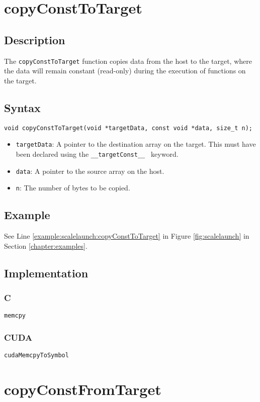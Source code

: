 \newpage
\section{copyConstToTarget}

\subsection{Description}

The \verb+copyConstToTarget+ function copies data from the host to the target, where the data will remain constant (read-only) during the execution of functions on the target.

\subsection{Syntax}
\begin{verbatim}
void copyConstToTarget(void *targetData, const void *data, size_t n);
\end{verbatim}

\begin{itemize}
\item \verb+targetData+: A pointer to the destination array on the target. This must have been declared using the \verb+__targetConst__ + keyword.
\item \verb+data+: A pointer to the source array on the host.
\item \verb+n+: The number of bytes to be copied.
\end{itemize}


\subsection{Example}
See Line \ref{example:scalelaunch:copyConstToTarget} in Figure \ref{fig:scalelaunch} in Section \ref{chapter:examples}.
\subsection{Implementation}
\subsubsection{C}
\verb+memcpy+
\subsubsection{CUDA}
\verb+cudaMemcpyToSymbol+

\newpage
\section{copyConstFromTarget}

